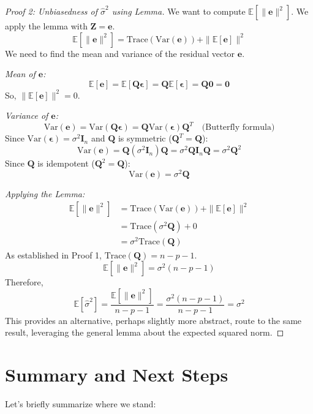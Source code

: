 \documentclass[11pt, letterpaper]{article}
\theoremstyle{definition}
\newcommand{\E}{\mathbb{E}}
\newcommand{\Var}{\text{Var}}
\newcommand{\Trace}{\text{Trace}}
\newcommand{\mat}[1]{\mathbf{#1}} %
\newcommand{\vect}[1]{\boldsymbol{#1}} %
\newcommand{\T}{^T} %
\begin{document}
\begin{proof}[Proof 2: Unbiasedness of $\hat{\sigma}^2$ using Lemma]
We want to compute $\E[\|\vect{e}\|^2]$. We apply the lemma with $\vect{Z} = \vect{e}$.
\[
\E[\|\vect{e}\|^2] = \Trace(\Var(\vect{e})) + \|\E[\vect{e}]\|^2
\]
We need to find the mean and variance of the residual vector $\vect{e}$.

\textit{Mean of $\vect{e}$:}
\[
\E[\vect{e}] = \E[\mat{Q}\vect{\epsilon}] = \mat{Q}\E[\vect{\epsilon}] = \mat{Q}\vect{0} = \vect{0}
\]
So, $\|\E[\vect{e}]\|^2 = 0$.

\textit{Variance of $\vect{e}$:}
\[
\Var(\vect{e}) = \Var(\mat{Q}\vect{\epsilon}) = \mat{Q} \Var(\vect{\epsilon}) \mat{Q}\T \quad \text{(Butterfly formula)}
\]
Since $\Var(\vect{\epsilon}) = \sigma^2 \mat{I}_n$ and $\mat{Q}$ is symmetric ($\mat{Q}\T = \mat{Q}$):
\[
\Var(\vect{e}) = \mat{Q} (\sigma^2 \mat{I}_n) \mat{Q} = \sigma^2 \mat{Q} \mat{I}_n \mat{Q} = \sigma^2 \mat{Q}^2
\]
Since $\mat{Q}$ is idempotent ($\mat{Q}^2 = \mat{Q}$):
\[
\Var(\vect{e}) = \sigma^2 \mat{Q}
\]

\textit{Applying the Lemma:}
\begin{align*}
\E[\|\vect{e}\|^2] &= \Trace(\Var(\vect{e})) + \|\E[\vect{e}]\|^2 \\
&= \Trace(\sigma^2 \mat{Q}) + 0 \\
&= \sigma^2 \Trace(\mat{Q})
\end{align*}
As established in Proof 1, $\Trace(\mat{Q}) = n - p - 1$.
\[
\E[\|\vect{e}\|^2] = \sigma^2 (n - p - 1)
\]
Therefore,
\[
\E[\hat{\sigma}^2] = \frac{\E[\|\vect{e}\|^2]}{n - p - 1} = \frac{\sigma^2 (n - p - 1)}{n - p - 1} = \sigma^2
\]
This provides an alternative, perhaps slightly more abstract, route to the same result, leveraging the general lemma about the expected squared norm.
\end{proof}

\section{Summary and Next Steps}

Let's briefly summarize where we stand:
\end{document}

